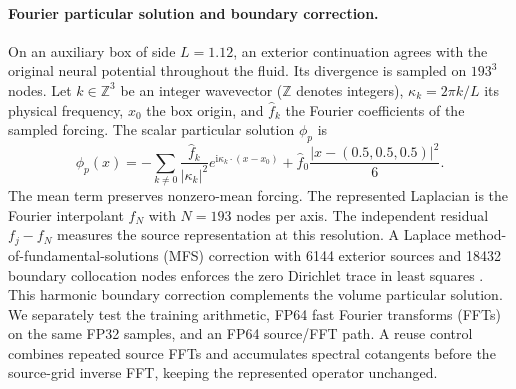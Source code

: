 \paragraph{Fourier particular solution and boundary correction.}
On an auxiliary box of side $L=1.12$, an exterior continuation agrees with the original neural potential throughout the fluid. Its divergence is sampled on $193^3$ nodes. Let $k\in\mathbb Z^3$ be an integer wavevector ($\mathbb Z$ denotes integers), $\kappa_k=2\pi k/L$ its physical frequency, $x_0$ the box origin, and $\widehat f_k$ the Fourier coefficients of the sampled forcing. The scalar particular solution $\phi_p$ is
\begin{equation}
\phi_p(x)=-\sum_{k\ne0}\frac{\widehat f_k}{|\kappa_k|^2}
e^{\mathrm i\kappa_k\cdot(x-x_0)}
+\widehat f_0\frac{|x-(0.5,0.5,0.5)|^2}{6}.
\end{equation}
The mean term preserves nonzero-mean forcing. The represented Laplacian is the Fourier interpolant $f_N$ with $N=193$ nodes per axis. The independent residual $f_j-f_N$ measures the source representation at this resolution. A Laplace method-of-fundamental-solutions (MFS) correction with 6144 exterior sources and 18432 boundary collocation nodes enforces the zero Dirichlet trace in least squares \citep{fairweather1998method}. This harmonic boundary correction complements the volume particular solution. We separately test the training arithmetic, FP64 fast Fourier transforms (FFTs) on the same FP32 samples, and an FP64 source/FFT path. A reuse control combines repeated source FFTs and accumulates spectral cotangents before the source-grid inverse FFT, keeping the represented operator unchanged.

